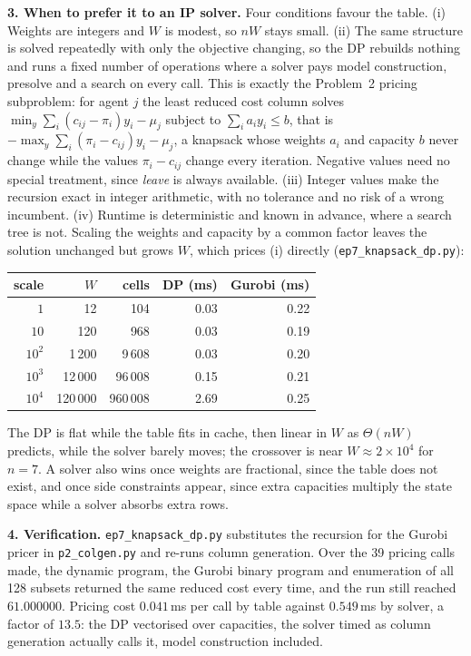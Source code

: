 \documentclass[10pt]{article}
\begin{document}
\textbf{3. When to prefer it to an IP solver.}
Four conditions favour the table. (i) Weights are integers and $W$ is
modest, so $nW$ stays small. (ii) The same structure is solved
repeatedly with only the objective changing, so the DP rebuilds
nothing and runs a fixed number of operations where a solver pays
model construction, presolve and a search on every call. This is
exactly the Problem~2 pricing subproblem: for agent $j$ the least
reduced cost column solves
$\min_{y} \sum_i (c_{ij} - \pi_i) y_i - \mu_j$ subject to
$\sum_i a_i y_i \le b$, that is
$-\max_{y} \sum_i (\pi_i - c_{ij}) y_i - \mu_j$, a knapsack whose
weights $a_i$ and capacity $b$ never change while the values
$\pi_i - c_{ij}$ change every iteration. Negative values need no
special treatment, since \emph{leave} is always available.
(iii) Integer values make the recursion exact in integer arithmetic,
with no tolerance and no risk of a wrong incumbent. (iv) Runtime is
deterministic and known in advance, where a search tree is not.
Scaling the weights and capacity by a common factor leaves the
solution unchanged but grows $W$, which prices (i) directly
(\texttt{ep7\_knapsack\_dp.py}):

\begin{center}\footnotesize
\setlength{\tabcolsep}{7pt}
\begin{tabular}{@{}rrrrr@{}}
\toprule
scale & $W$ & cells & DP (ms) & Gurobi (ms)\\
\midrule
$1$      &      12 &       104 & 0.03 & 0.22\\
$10$     &     120 &       968 & 0.03 & 0.19\\
$10^{2}$ &  1\,200 &   9\,608 & 0.03 & 0.20\\
$10^{3}$ & 12\,000 &  96\,008 & 0.15 & 0.21\\
$10^{4}$ & 120\,000 & 960\,008 & 2.69 & 0.25\\
\bottomrule
\end{tabular}
\end{center}

The DP is flat while the table fits in cache, then linear in $W$ as
$\Theta(nW)$ predicts, while the solver barely moves; the crossover is
near $W \approx 2 \times 10^{4}$ for $n = 7$. A solver also wins once
weights are fractional, since the table does not exist, and once side
constraints appear, since extra capacities multiply the state space
while a solver absorbs extra rows.

\textbf{4. Verification.}
\texttt{ep7\_knapsack\_dp.py} substitutes the recursion for the Gurobi
pricer in \texttt{p2\_colgen.py} and re-runs column generation. Over
the 39 pricing calls made, the dynamic program, the Gurobi binary
program and enumeration of all 128 subsets returned the same reduced
cost every time, and the run still reached $61.000000$. Pricing cost
$0.041$\,ms per call by table against $0.549$\,ms by solver, a factor
of $13.5$: the DP vectorised over capacities, the solver timed as
column generation actually calls it, model construction included.
\end{document}
